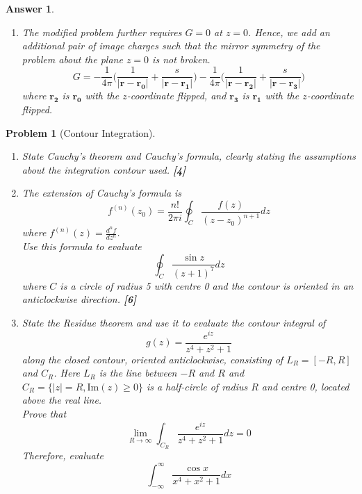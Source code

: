 \documentclass[a4paper]{article}
\newtheorem{ans}{Answer}[section]
\theoremstyle{new}
\newtheorem{qns}{Problem}[section]
\begin{document}
\begin{ans}
\begin{enumerate}[label=(\alph*)]
But $G=0$ (Dirichlet's boundary condition), so $s=-\frac{1}{|\mathbf{r_0}|}$ and so $\mathbf{r_1}=\frac{1}{|\mathbf{r_0}|^2}\mathbf{r_0}$.
\item The modified problem further requires $G=0$ at $z=0$. Hence, we add an additional pair of image charges such that the mirror symmetry of the problem about the plane $z=0$ is not broken.
$$G=-\frac{1}{4\pi}\bigg(\frac{1}{|\mathbf{r}-\mathbf{r_0}|}+\frac{s}{|\mathbf{r}-\mathbf{r_1}|}\bigg)-\frac{1}{4\pi}\bigg(\frac{1}{|\mathbf{r}-\mathbf{r_2}|}+\frac{s}{|\mathbf{r}-\mathbf{r_3}|}\bigg)$$
where $\mathbf{r_2}$ is $\mathbf{r_0}$ with the $z$-coordinate flipped, and $\mathbf{r_3}$ is $\mathbf{r_1}$ with the $z$-coordinate flipped.
\end{enumerate}
\end{ans}
\newpage
\begin{qns}[Contour Integration]\leavevmode
\begin{enumerate}[label=(\alph*)]
\item State Cauchy’s theorem and Cauchy’s formula, clearly stating the assumptions about the integration contour used. \hfill\textbf{[4]}
\item The extension of Cauchy’s formula is
$$f^{(n)}(z_0)=\frac{n!}{2\pi i}\oint_C\frac{f(z)}{(z-z_0)^{n+1}}dz$$
where $f^{(n)}(z) = \frac{d^nf}{dz^n}$.\\[5pt]
Use this formula to evaluate
$$\oint_C\frac{\sin z}{(z+1)^7}dz$$
where $C$ is a circle of radius 5 with centre 0 and the contour is oriented in an anticlockwise direction. \hfill\textbf{[6]}
\item State the Residue theorem and use it to evaluate the contour integral of
$$g(z)=\frac{e^{iz}}{z^4+z^2+1}$$
along the closed contour, oriented anticlockwise, consisting of $L_R = [−R,R]$ and $C_R$. Here $L_R$ is the line between $−R$ and $R$ and $C_R = \{|z| = R, \text{Im}(z)\geq 0\}$ is a half-circle of radius $R$ and centre 0, located above the real line.\\[5pt]
Prove that
$$\lim_{R\rightarrow\infty}\int_{C_R}\frac{e^{iz}}{z^4+z^2+1}dz=0$$
Therefore, evaluate 
$$\int_{-\infty}^\infty\frac{\cos x}{x^4+x^2+1}dx$$
\end{enumerate}
\end{qns}
\end{document}
